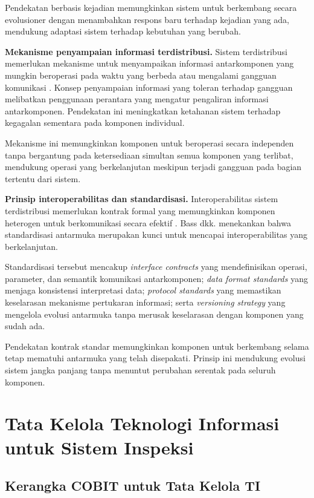 Pendekatan berbasis kejadian memungkinkan sistem untuk berkembang secara evolusioner dengan menambahkan respons baru terhadap kejadian yang ada, mendukung adaptasi sistem terhadap kebutuhan yang berubah.

\textbf{Mekanisme penyampaian informasi terdistribusi.}
Sistem terdistribusi memerlukan mekanisme untuk menyampaikan informasi antarkomponen yang mungkin beroperasi pada waktu yang berbeda atau mengalami gangguan komunikasi \autocite{kleppmann2017}. Konsep penyampaian informasi yang toleran terhadap gangguan melibatkan penggunaan perantara yang mengatur pengaliran informasi antarkomponen. Pendekatan ini meningkatkan ketahanan sistem terhadap kegagalan sementara pada komponen individual.

Mekanisme ini memungkinkan komponen untuk beroperasi secara independen tanpa bergantung pada ketersediaan simultan semua komponen yang terlibat, mendukung operasi yang berkelanjutan meskipun terjadi gangguan pada bagian tertentu dari sistem.

\textbf{Prinsip interoperabilitas dan standardisasi.}
Interoperabilitas sistem terdistribusi memerlukan kontrak formal yang
memungkinkan komponen heterogen untuk berkomunikasi secara efektif
\autocite{bass2022}. Bass dkk. menekankan bahwa standardisasi antarmuka
merupakan kunci untuk mencapai interoperabilitas yang berkelanjutan.

Standardisasi tersebut mencakup \textit{interface contracts} yang mendefinisikan
operasi, parameter, dan semantik komunikasi antarkomponen; \textit{data format
standards} yang menjaga konsistensi interpretasi data; \textit{protocol
standards} yang memastikan keselarasan mekanisme pertukaran informasi; serta
\textit{versioning strategy} yang mengelola evolusi antarmuka tanpa merusak
keselarasan dengan komponen yang sudah ada.

Pendekatan kontrak standar memungkinkan komponen untuk berkembang selama
tetap mematuhi antarmuka yang telah disepakati. Prinsip ini mendukung evolusi
sistem jangka panjang tanpa menuntut perubahan serentak pada seluruh komponen.

\section{Tata Kelola Teknologi Informasi untuk Sistem Inspeksi}

\subsection{Kerangka COBIT untuk Tata Kelola TI}

